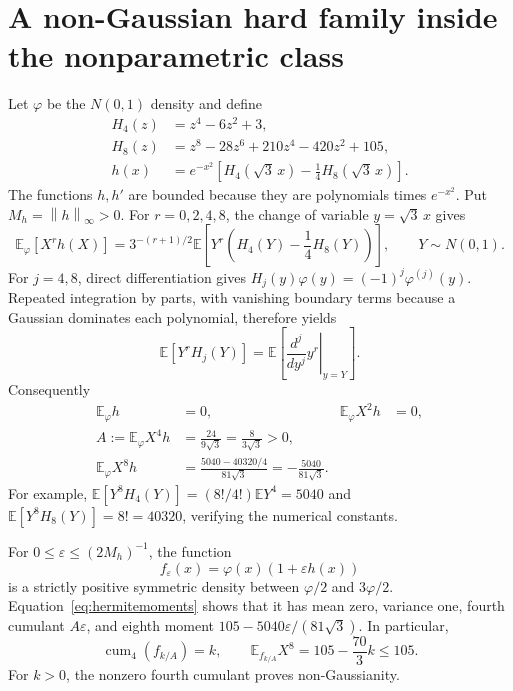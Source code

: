 \documentclass[11pt,a4paper]{article}
\numberwithin{equation}{section}
\newcommand{\E}{\mathbb E}
\newcommand{\norm}[1]{\left\lVert #1\right\rVert}
\DeclareMathOperator{\cum}{cum}
\begin{document}
\section{A non-Gaussian hard family inside the nonparametric class}
\label{sec:hard}
Let \(\varphi\) be the \(N(0,1)\) density and define
\begin{align*}
 H_4(z)&=z^4-6z^2+3,\\
 H_8(z)&=z^8-28z^6+210z^4-420z^2+105,\\
 h(x)&=e^{-x^2}\left[H_4(\sqrt3\,x)-\frac14H_8(\sqrt3\,x)\right].
\end{align*}
The functions \(h,h'\) are bounded because they are polynomials times
\(e^{-x^2}\). Put \(M_h=\norm h_\infty>0\).
For \(r=0,2,4,8\), the change of variable \(y=\sqrt3\,x\) gives
\[
 \E_\varphi[X^rh(X)]
 =3^{-(r+1)/2}\E\left[Y^r\left(H_4(Y)-\frac14H_8(Y)\right)\right],
 \qquad Y\sim N(0,1).
\]
For \(j=4,8\), direct differentiation gives
\(H_j(y)\varphi(y)=(-1)^j\varphi^{(j)}(y)\).
Repeated integration by parts, with vanishing boundary terms because a
Gaussian dominates each polynomial, therefore yields
\[
 \E[Y^rH_j(Y)]
 =\E\left[\left.\frac{d^j}{dy^j}y^r\right|_{y=Y}\right].
\]
Consequently
\begin{equation}\label{eq:hermitemoments}
 \begin{aligned}
 \E_\varphi h&=0,& \E_\varphi X^2h&=0,\\
 A:=\E_\varphi X^4h&=\frac{24}{9\sqrt3}
                    =\frac8{3\sqrt3}>0,\\
 \E_\varphi X^8h
 &=\frac{5040-40320/4}{81\sqrt3}
   =-\frac{5040}{81\sqrt3}.
 \end{aligned}
\end{equation}
For example,
\(\E[Y^8H_4(Y)]=(8!/4!)\E Y^4=5040\) and
\(\E[Y^8H_8(Y)]=8!=40320\), verifying the numerical constants.

For \(0\le\varepsilon\le(2M_h)^{-1}\), the function
\[
 f_\varepsilon(x)=\varphi(x)(1+\varepsilon h(x))
\]
is a strictly positive symmetric density between
\(\varphi/2\) and \(3\varphi/2\).
Equation~\eqref{eq:hermitemoments} shows that it has mean zero, variance
one, fourth cumulant \(A\varepsilon\), and eighth moment
\(105-5040\varepsilon/(81\sqrt3)\).
In particular,
\begin{equation}\label{eq:perturbmoments}
 \cum_4(f_{k/A})=k,\qquad
 \E_{f_{k/A}}X^8=105-\frac{70}{3}k\le105.
\end{equation}
For \(k>0\), the nonzero fourth cumulant proves non-Gaussianity.
\end{document}
